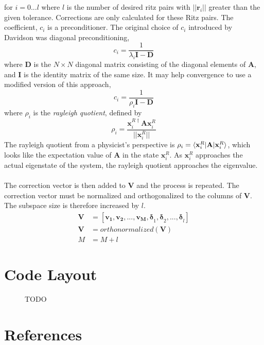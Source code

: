 \documentclass{revtex4}
\begin{document}
for $i =0...l$ where $l$ is the number of desired ritz pairs with $||\mathbf{r}_i||$ greater than the given tolerance. Corrections are only calculated for these Ritz pairs. The coefficient, $c_i$ is a preconditioner. The original choice of $c_i$ introduced by Davidson\cite{Davidson1975} was diagonal preconditioning, 
\begin{equation}
c_i = \frac{1}{\lambda_i\mathbf{I}-\mathbf{D}}
\end{equation}
where $\mathbf{D}$ is the $N\times N$ diagonal matrix consisting of the diagonal elements of $\mathbf{A}$, and $\mathbf{I}$ is the identity matrix of the same size. It may help convergence to use a modified version of this approach, 
\begin{equation}
c_i = \frac{1}{\rho_i\mathbf{I}-\mathbf{D}}
\end{equation}
where $\rho_i$ is the \emph{rayleigh quotient}, defined by
\begin{equation}
\rho_i = \frac{\mathbf{x}_i^{R\dag}\mathbf{A}\mathbf{x}_i^{R}}{||\mathbf{x}_i^{R}||}
\end{equation}
The rayleigh quotient from a physicist's perspective is $\rho_i = \braket{\mathbf{x}_i^{R}|\mathbf{A}|\mathbf{x}_i^{R}}$, which looks like the expectation value of $\mathbf{A}$ in the state $\mathbf{x}_i^{R}$. As $\mathbf{x}_i^{R}$ approaches the actual eigenstate of the system, the rayleigh quotient approaches the eigenvalue.
\\\\
The correction vector is then added to $\mathbf{V}$ and the process is repeated. The correction vector must be normalized and orthogonalized to the columns of $\mathbf{V}$. The subspace size is therefore increased by $l$. 
\begin{subequations}
\begin{align}
\mathbf{V} &= [\mathbf{v_1,v_2,...,v_M}\mathbf{,\delta}_1\mathbf{,\delta}_2,...\mathbf{,\delta}_l] \\
\mathbf{V} &= orthonormalized(\mathbf{V})\\
M &= M + l
\end{align}
\end{subequations}


\section{Code Layout}
\begin{figure}[H]
    TODO
\end{figure} 

\section{References}

\end{document}
